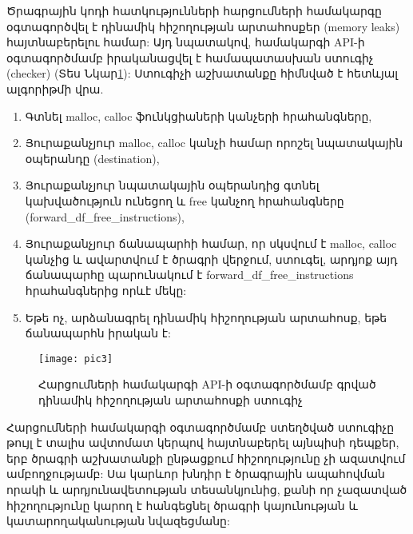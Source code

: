 Ծրագրային կոդի հատկությունների հարցումների համակարգը օգտագործվել է դինամիկ հիշողության
արտահոսքեր (memory leaks)\cite{MEMORYLEAK} հայտնաբերելու համար: Այդ նպատակով, համակարգի API-ի օգտագործմամբ
իրականացվել է համապատասխան ստուգիչ (checker) (Տես Նկար\ref{fig:figure3}): Ստուգիչի աշխատանքը հիմնված է հետևյալ ալգորիթմի վրա.
\begin{enumerate}
    \item Գտնել malloc, calloc ֆունկցիաների կանչերի հրահանգները,
    \item Յուրաքանչյուր malloc, calloc կանչի համար որոշել նպատակային օպերանդը (destination),
    \item Յուրաքանչյուր նպատակային օպերանդից գտնել կախվածություն ունեցող և free կանչող հրահանգները (forward\_df\_free\_instructions),
    \item Յուրաքանչյուր ճանապարհի համար, որ սկսվում է malloc, calloc կանչից և ավարտվում է ծրագրի վերջում, ստուգել,
    արդյոք այդ ճանապարհը պարունակում է forward\_df\_free\_instructions հրահանգներից որևէ մեկը:
    \item Եթե ոչ, արձանագրել դինամիկ հիշողության արտահոսք, եթե ճանապարհն իրական է:
\end{enumerate}

\begin{figure}[h]
    \centering
    \texttt{[image: pic3]}
    \caption{Հարցումների համակարգի API-ի օգտագործմամբ գրված դինամիկ հիշողության արտահոսքի ստուգիչ}
    \label{fig:figure3}
\end{figure}

Հարցումների համակարգի օգտագործմամբ ստեղծված ստուգիչը թույլ է տալիս ավտոմատ կերպով հայտնաբերել
այնպիսի դեպքեր, երբ ծրագրի աշխատանքի ընթացքում հիշողությունը չի ազատվում ամբողջությամբ: Սա կարևոր խնդիր է ծրագրային
ապահովման որակի և արդյունավետության տեսանկյունից, քանի որ չազատված հիշողությունը կարող է հանգեցնել ծրագրի
կայունության և կատարողականության նվազեցմանը:


